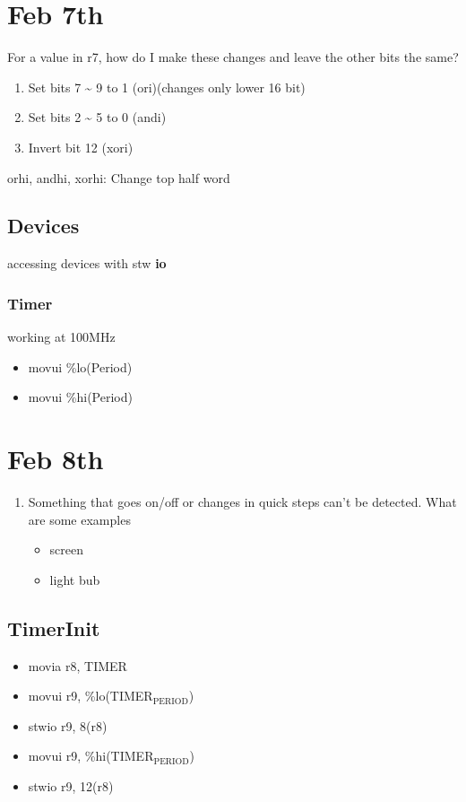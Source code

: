 \documentclass[11pt]{article}
\begin{document}
\section{Feb 7th}
\label{sec:orgheadline57}
For a value in r7, how do I make these changes and leave the other bits the same?
\begin{enumerate}
\item Set bits 7 \textasciitilde{} 9 to 1 (ori)(changes only lower 16 bit)
\item Set bits 2 \textasciitilde{} 5 to 0 (andi)
\item Invert bit 12 (xori)
\end{enumerate}

orhi, andhi, xorhi: Change top half word
\subsection{Devices}
\label{sec:orgheadline56}
accessing devices with stw \textbf{io}
\subsubsection{Timer}
\label{sec:orgheadline55}
working at 100MHz
\begin{itemize}
\item movui \%lo(Period)
\item movui \%hi(Period)
\end{itemize}
\section{Feb 8th}
\label{sec:orgheadline60}
\begin{enumerate}
\item Something that goes on/off or changes in quick steps can't be detected. What are some examples
\begin{itemize}
\item screen
\item light bub
\end{itemize}
\end{enumerate}
\subsection{TimerInit}
\label{sec:orgheadline58}
\begin{itemize}
\item movia r8, TIMER
\item movui r9, \%lo(TIMER\(_{\text{PERIOD}}\))
\item stwio r9, 8(r8)
\item movui r9, \%hi(TIMER\(_{\text{PERIOD}}\))
\item stwio r9, 12(r8)
\end{itemize}
\end{document}
